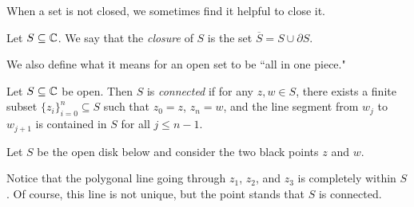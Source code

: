 \documentclass{article}
\begin{document}
When a set is not closed, we sometimes find it helpful to close it.
\begin{definition}
Let $S\subseteq\mathbb C$. We say that the \textit{closure} of $S$ is the set $\overline S = S\cup \partial S$.
\end{definition}
We also define what it means for an open set to be ``all in one piece."
\begin{definition}
Let $S\subseteq\mathbb C$ be open. Then $S$ is \textit{connected} if for any $z, w\in S$, there exists a finite subset $\{z_i\}_{i=0}^n\subseteq S$ such that $z_0 = z$, $z_n = w$, and the line segment from $w_j$ to $w_{j+1}$ is contained in $S$ for all $j\leq n-1$. 
\end{definition}
\begin{example}
Let $S$ be the open disk below and consider the two black points $z$ and $w$.
\begin{center}
\end{center}
Notice that the polygonal line going through $z_1$, $z_2$, and $z_3$ is completely within $S$. Of course, this line is not unique, but the point stands that $S$ is connected.
\end{example}
\end{document}
